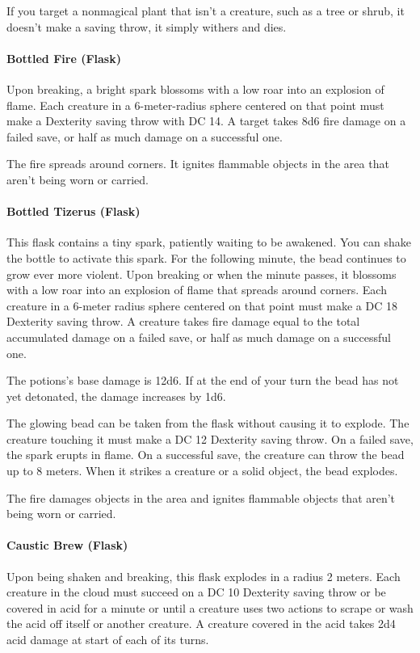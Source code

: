         If you target a nonmagical plant that isn't a creature, such as a tree or shrub, it doesn't make a saving throw, it simply withers and dies.
    \paragraph{Bottled Fire (Flask)} %
        Upon breaking, a bright spark blossoms with a low roar into an explosion of flame.
        Each creature in a 6-meter-radius sphere centered on that point must make a Dexterity saving throw with DC 14.
        A target takes 8d6 fire damage on a failed save, or half as much damage on a successful one.

        The fire spreads around corners.
        It ignites flammable objects in the area that aren't being worn or carried.
    \paragraph{Bottled Tizerus (Flask)} %
        This flask contains a tiny spark, patiently waiting to be awakened.
        You can shake the bottle to activate this spark.
        For the following minute, the bead continues to grow ever more violent.
        Upon breaking or when the minute passes, it blossoms with a low roar into an explosion of flame that spreads around corners.
        Each creature in a 6-meter radius sphere centered on that point must make a DC 18 Dexterity saving throw.
        A creature takes fire damage equal to the total accumulated damage on a failed save, or half as much damage on a successful one.

        The potions's base damage is 12d6.
        If at the end of your turn the bead has not yet detonated, the damage increases by 1d6.

        The glowing bead can be taken from the flask without causing it to explode.
        The creature touching it must make a DC 12 Dexterity saving throw.
        On a failed save, the spark erupts in flame.
        On a successful save, the creature can throw the bead up to 8 meters.
        When it strikes a creature or a solid object, the bead explodes.

        The fire damages objects in the area and ignites flammable objects that aren't being worn or carried.
    \paragraph{Caustic Brew (Flask)} %
        Upon being shaken and breaking, this flask explodes in a radius 2 meters.
        Each creature in the cloud must succeed on a DC 10 Dexterity saving throw or be covered in acid for a minute or until a creature uses two actions to scrape or wash the acid off itself or another creature.
        A creature covered in the acid takes 2d4 acid damage at start of each of its turns.
